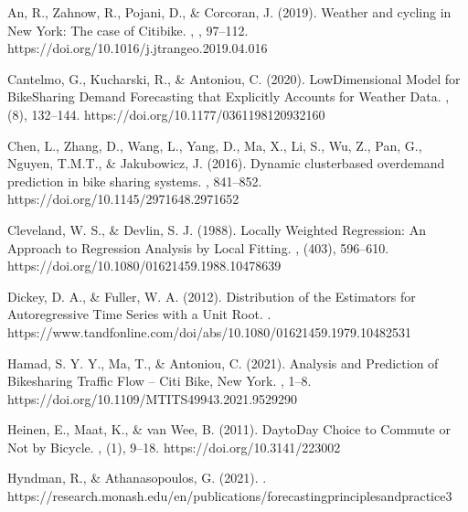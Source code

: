 \documentclass[letterpaper,10pt,english]{jupyterBook}
\begin{document}
\sphinxAtStartPar
An, R., Zahnow, R., Pojani, D., \& Corcoran, J. (2019). Weather and cycling in New York: The case of Citibike. , , 97–112. https://doi.org/10.1016/j.jtrangeo.2019.04.016

\sphinxAtStartPar
Cantelmo, G., Kucharski, R., \& Antoniou, C. (2020). Low\sphinxhyphen{}Dimensional Model for Bike\sphinxhyphen{}Sharing Demand Forecasting that Explicitly Accounts for Weather Data. , (8), 132–144. https://doi.org/10.1177/0361198120932160

\sphinxAtStartPar
Chen, L., Zhang, D., Wang, L., Yang, D., Ma, X., Li, S., Wu, Z., Pan, G., Nguyen, T.\sphinxhyphen{}M.\sphinxhyphen{}T., \& Jakubowicz, J. (2016). Dynamic cluster\sphinxhyphen{}based over\sphinxhyphen{}demand prediction in bike sharing systems. , 841–852. https://doi.org/10.1145/2971648.2971652

\sphinxAtStartPar
Cleveland, W. S., \& Devlin, S. J. (1988). Locally Weighted Regression: An Approach to Regression Analysis by Local Fitting. , (403), 596–610. https://doi.org/10.1080/01621459.1988.10478639

\sphinxAtStartPar
Dickey, D. A., \& Fuller, W. A. (2012). Distribution of the Estimators for Autoregressive Time Series with a Unit Root. . https://www.tandfonline.com/doi/abs/10.1080/01621459.1979.10482531

\sphinxAtStartPar
Hamad, S. Y. Y., Ma, T., \& Antoniou, C. (2021). Analysis and Prediction of Bikesharing Traffic Flow – Citi Bike, New York. , 1–8. https://doi.org/10.1109/MT\sphinxhyphen{}ITS49943.2021.9529290

\sphinxAtStartPar
Heinen, E., Maat, K., \& van Wee, B. (2011). Day\sphinxhyphen{}to\sphinxhyphen{}Day Choice to Commute or Not by Bicycle. , (1), 9–18. https://doi.org/10.3141/2230\sphinxhyphen{}02

\sphinxAtStartPar
Hyndman, R., \& Athanasopoulos, G. (2021). . https://research.monash.edu/en/publications/forecasting\sphinxhyphen{}principles\sphinxhyphen{}and\sphinxhyphen{}practice\sphinxhyphen{}3
\end{document}
